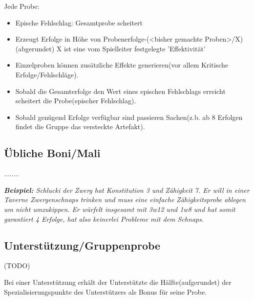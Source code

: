 Jede Probe:
\begin{itemize}
\item Epische Fehlschlag: Gesamtprobe scheitert
\item Erzeugt Erfolge in Höhe von Probenerfolge-(<bisher gemachte Proben>/X)(abgerundet) X ist eine vom Spielleiter festgelegte 'Effektivität'
\item Einzelproben können zusätzliche Effekte generieren(vor allem Kritische Erfolge/Fehlschläge).
\item Sobald die Gesamterfolge den Wert eines epischen Fehlschlags erreicht scheitert die Probe(epischer Fehlschlag).
\item Sobald genügend Erfolge verfügbar sind passieren Sachen(z.b. ab 8 Erfolgen findet die Gruppe das versteckte Artefakt).
\end{itemize}

\subsection{Übliche Boni/Mali}

........

\textit{\textbf{Beispiel:} 
Schlucki der Zwerg hat Konstitution 3 und Zähigkeit 7. Er will in einer Taverne Zwergenschnaps trinken und muss eine einfache Zähigkeitsprobe ablegen um nicht umzukippen. Er würfelt insgesamt mit 3w12 und 1w8 und hat somit garantiert 4 Erfolge, hat also keinerlei Probleme mit dem Schnaps. }


\subsection{Unterstützung/Gruppenprobe}
(TODO)

Bei einer Unterstützung erhält der Unterstützte die Hälfte(aufgerundet) der Spezialisierungspunkte des Unterstützers als Bonus für seine Probe.

